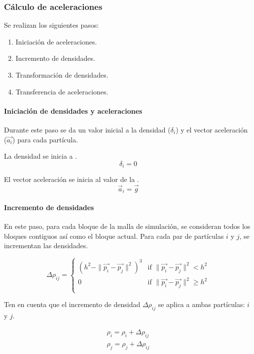 \subsubsection{Cálculo de aceleraciones}

Se realizan los siguientes pasos:

\begin{enumerate}
\item Iniciación de aceleraciones.
\item Incremento de densidades.
\item Transformación de densidades.
\item Transferencia de aceleraciones.
\end{enumerate}

\paragraph{Iniciación de densidades y aceleraciones}
Durante este paso se da un valor inicial a la densidad ($\delta_i$)
y el vector aceleración ($\vec{a_i}$) para cada partícula.

La densidad se inicia a .
\[
\delta_i = 0
\]

El vector aceleración se inicia al valor de la .
\[
\vec{a}_i = \vec{g}
\]

\paragraph{Incremento de densidades}
En este paso, para cada bloque de la malla de simulación, se consideran todos 
los bloques contiguos así como el bloque actual. Para cada par de partículas
$i$ y $j$, se incrementan las densidades.

\[
\Delta \rho_{ij} = 
    \begin{cases}
      (h^2 - \|\vec{p_i} - \vec{p_j}\|^2)^3 & 
          \text{if  } \|\vec{p_i} - \vec{p_j}\|^2 < h^2\\
      0 & 
          \text{if  } \|\vec{p_i} - \vec{p_j}\|^2 \geq h^2\\
    \end{cases}
\]

Ten en cuenta que el incremento de densidad $\Delta \rho_{ij}$ se aplica a ambas
partículas: $i$ y $j$.

\[
\begin{split}
\rho_i = \rho_i + \Delta \rho_{ij}\\
\rho_j = \rho_j + \Delta \rho_{ij}\\
\end{split}
\]

